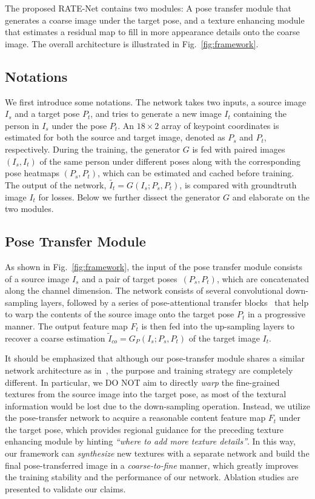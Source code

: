 \documentclass{article}
\begin{document}
The proposed RATE-Net contains two modules: A pose transfer module that generates a coarse image under the target pose, and a texture enhancing module that estimates a residual map to fill in more appearance details onto the coarse image. The overall architecture is illustrated in Fig.~\ref{fig:framework}.

\subsection{Notations}
We first introduce some notations. The network takes two inputs, a source image $I_s$ and a target pose $P_t$, and tries to generate a new image $I_t$ containing the person in $I_s$ under the pose $P_t$. An $18\times 2$ array of keypoint coordinates is estimated for both the source and target image, denoted as $P_s$ and $P_t$, respectively. During the training, the generator $G$ is fed with paired images $(I_s, I_t)$ of the same person under different poses along with the corresponding pose heatmaps $(P_s, P_t)$, which can be estimated and cached before training. The output of the network, $\tilde{I_t} = G(I_s; P_s, P_t)$, is compared with groundtruth image $I_t$ for losses. Below we further dissect the generator $G$ and elaborate on the two modules.

\subsection{Pose Transfer Module}\label{section:pose}
As shown in Fig.~\ref{fig:framework}, the input of the pose transfer module consists of a source image $I_s$ and a pair of target poses~$(P_s, P_t)$, which are concatenated along the channel dimension. The network consists of several convolutional down-sampling layers, followed by a series of pose-attentional transfer blocks~\cite{PATN} that help to warp the contents of the source image onto the target pose $P_t$ in a progressive manner. The output feature map $F_t$ is then fed into the up-sampling layers to recover a coarse estimation $\tilde{I}_{co}= G_P(I_s; P_s, P_t)$ of the target image $I_t$.

It should be emphasized that although our pose-transfer module shares a similar network architecture as in~\cite{PATN}, the purpose and training strategy are completely different. In particular, we DO NOT aim to directly \emph{warp} the fine-grained textures from the source image into the target pose, as most of the textural information would be lost due to the down-sampling operation. Instead, we utilize the pose-transfer network to acquire a reasonable content feature map $F_t$ under the target pose, which provides regional guidance for the preceding texture enhancing module by hinting \emph{``where to add more texture details''}. In this way, our framework can \emph{synthesize} new textures with a separate network and build the final pose-transferred image in a \emph{coarse-to-fine} manner, which greatly improves the training stability and the performance of our network. Ablation studies are presented to validate our claims.
\end{document}
